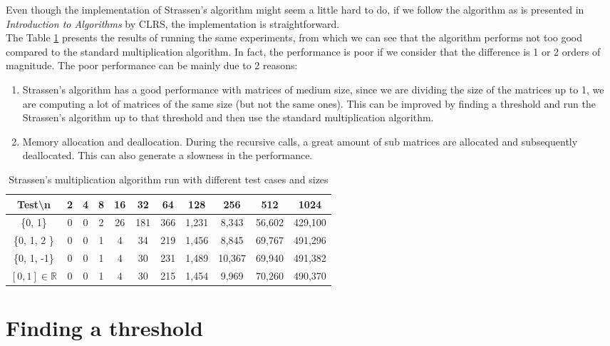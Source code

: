 \documentclass[tikz, 12pt]{scrartcl}
\begin{document}
Even though the implementation of Strassen's algorithm might seem a little hard to do, if we follow the algorithm as is presented in \textit{Introduction to Algorithms} by CLRS, the implementation is straightforward. \\
The Table \ref{strassenResults} presents the results of running the same experiments, from which we can see that the algorithm performs not too good compared to the standard multiplication algorithm. In fact, the performance is poor if we consider that the difference is 1 or 2 orders of magnitude. The poor performance can be mainly due to 2 reasons:
\begin{enumerate}
	\item Strassen's algorithm has a good performance with matrices of medium size, since we are dividing the size of the matrices up to 1, we are computing a lot of matrices of the same size (but not the same ones). This can be improved by finding a threshold and run the Strassen's algorithm up to that threshold and then use the standard multiplication algorithm.
	\item Memory allocation and deallocation. During the recursive calls, a great amount of sub matrices are allocated and subsequently deallocated. This can also generate a slowness in the performance.
\end{enumerate}


\begin{table}[h!]
\caption{Strassen's multiplication algorithm run with different test cases and sizes\label{strassenResults}}
\centering
\begin{tabular}{|c|cccccccccc|}
\hline
Test\textbackslash  n		&	2	&	4	&	8	&	16	&	32	&	64	&	128		&	256		&	512		&	1024\\
\hline
\{0, 1\}				&	0	&	0	&	2	&	26	&	181	&	366	&	1,231	&	8,343	&	56,602	&	429,100\\
\{0, 1, 2 \}				&	0	&	0	&	1	&	4	&	34	&	219	&	1,456	&	8,845	&	69,767	&	491,296\\
\{0, 1, -1\}				&	0	&	0	&	1	&	4	&	30	&	231	&	1,489	&	10,367	&	69,940	&	491,382\\
$[0, 1] \in \mathbb{R}$	&	0	&	0	&	1	&	4	&	30	&	215	&	1,454	&	9,969	&	70,260	&	490,370\\
\hline
\end{tabular}
\end{table}

\section{Finding a threshold}
\end{document}

